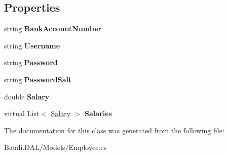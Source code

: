 \subsection*{Properties}
\begin{DoxyCompactItemize}
\item 
\hypertarget{class_baudi_1_1_d_a_l_1_1_models_1_1_employee_add2ffb2960637e71fd6f4887628df089}{}string {\bfseries Bank\+Account\+Number}\label{class_baudi_1_1_d_a_l_1_1_models_1_1_employee_add2ffb2960637e71fd6f4887628df089}

\item 
\hypertarget{class_baudi_1_1_d_a_l_1_1_models_1_1_employee_a82dca8c2d04d142578655b87a6d68ce3}{}string {\bfseries Username}\label{class_baudi_1_1_d_a_l_1_1_models_1_1_employee_a82dca8c2d04d142578655b87a6d68ce3}

\item 
\hypertarget{class_baudi_1_1_d_a_l_1_1_models_1_1_employee_a6210f89bbf7a94aee5468de727832349}{}string {\bfseries Password}\label{class_baudi_1_1_d_a_l_1_1_models_1_1_employee_a6210f89bbf7a94aee5468de727832349}

\item 
\hypertarget{class_baudi_1_1_d_a_l_1_1_models_1_1_employee_a23c6dd0e2430b14b7183623bc709b465}{}string {\bfseries Password\+Salt}\label{class_baudi_1_1_d_a_l_1_1_models_1_1_employee_a23c6dd0e2430b14b7183623bc709b465}

\item 
\hypertarget{class_baudi_1_1_d_a_l_1_1_models_1_1_employee_a75466ac80fa17d1d9185894bdc3e5e88}{}double {\bfseries Salary}\label{class_baudi_1_1_d_a_l_1_1_models_1_1_employee_a75466ac80fa17d1d9185894bdc3e5e88}

\item 
\hypertarget{class_baudi_1_1_d_a_l_1_1_models_1_1_employee_a7cea836a6c31a9c9f1e10326eab0d4a0}{}virtual List$<$ \hyperlink{class_baudi_1_1_d_a_l_1_1_models_1_1_salary}{Salary} $>$ {\bfseries Salaries}\label{class_baudi_1_1_d_a_l_1_1_models_1_1_employee_a7cea836a6c31a9c9f1e10326eab0d4a0}

\end{DoxyCompactItemize}


The documentation for this class was generated from the following file\+:\begin{DoxyCompactItemize}
\item 
Baudi.\+D\+A\+L/\+Models/Employee.\+cs\end{DoxyCompactItemize}
